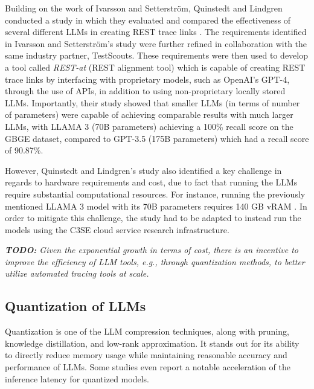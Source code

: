 \documentclass[conference]{IEEEtran}
\begin{document}
Building on the work of Ivarsson and Setterström, Quinstedt and Lindgren conducted a study in which they evaluated and compared the effectiveness of several different LLMs in creating REST trace links \cite{quinstedt2024Optimizing}. The requirements identified in Ivarsson and Setterström's study \cite{ivarsson2023automated} were further refined in collaboration with the same industry partner, TestScouts. These requirements were then used to develop a tool called \textit{REST-at} (REST alignment tool) which is capable of creating REST trace links by interfacing with proprietary models, such as OpenAI's GPT-4, through the use of APIs, in addition to using non-proprietary locally stored LLMs. Importantly, their study showed that smaller LLMs (in terms of number of parameters) were capable of achieving comparable results with much larger LLMs, with LLAMA 3 (70B parameters) achieving a 100\% recall score on the GBGE dataset, compared to GPT-3.5 (175B parameters) which had a recall score of 90.87\%. 

However, Quinstedt and Lindgren's study also identified a key challenge in regards to hardware requirements and cost, due to fact that running the LLMs require substantial computational resources. For instance, running the previously mentioned LLAMA 3 model with its 70B parameters requires 140 GB vRAM \cite{quinstedt2024Optimizing}. In order to mitigate this challenge, the study had to be adapted to instead run the models using the C3SE cloud service research infrastructure. %


\textit{\textbf{TODO:} Given the exponential growth in terms of cost,
there is an incentive to improve the efficiency of LLM tools,
e.g., through quantization methods, to better utilize automated
tracing tools at scale.} %


\subsection{Quantization of LLMs}

Quantization is one of the LLM compression techniques, along with pruning, knowledge distillation, and low-rank approximation\cite{bai2024beyond}. It stands out for its ability to directly reduce memory usage while maintaining reasonable accuracy and performance of LLMs. Some studies even report a notable acceleration of the inference latency for quantized models\cite{shen2024exploring}.
\end{document}
